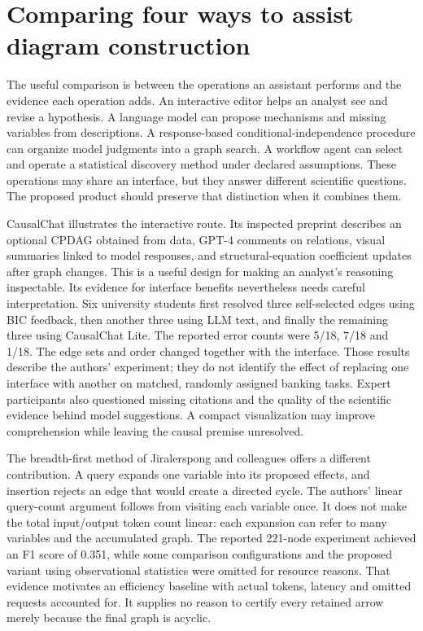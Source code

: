 \hypertarget{comparing-four-ways-to-assist-diagram-construction}{%
\section{Comparing four ways to assist diagram
construction}\label{comparing-four-ways-to-assist-diagram-construction}}

The useful comparison is between the operations an assistant performs
and the evidence each operation adds. An interactive editor helps an
analyst see and revise a hypothesis. A language model can propose
mechanisms and missing variables from descriptions. A response-based
conditional-independence procedure can organize model judgments into a
graph search. A workflow agent can select and operate a statistical
discovery method under declared assumptions. These operations may share
an interface, but they answer different scientific questions. The
proposed product should preserve that distinction when it combines them.

CausalChat illustrates the interactive route. Its inspected preprint
describes an optional CPDAG obtained from data, GPT-4 comments on
relations, visual summaries linked to model responses, and
structural-equation coefficient updates after graph changes. This is a
useful design for making an analyst's reasoning inspectable. Its
evidence for interface benefits nevertheless needs careful
interpretation. Six university students first resolved three
self-selected edges using BIC feedback, then another three using LLM
text, and finally the remaining three using CausalChat Lite. The
reported error counts were 5/18, 7/18 and 1/18. The edge sets and order
changed together with the interface. Those results describe the authors'
experiment; they do not identify the effect of replacing one interface
with another on matched, randomly assigned banking tasks. Expert
participants also questioned missing citations and the quality of the
scientific evidence behind model suggestions. A compact visualization
may improve comprehension while leaving the causal premise unresolved.
\citep{v12_la_2410_14146}

The breadth-first method of Jiralerspong and colleagues offers a
different contribution. A query expands one variable into its proposed
effects, and insertion rejects an edge that would create a directed
cycle. The authors' linear query-count argument follows from visiting
each variable once. It does not make the total input/output token count
linear: each expansion can refer to many variables and the accumulated
graph. The reported 221-node experiment achieved an F1 score of 0.351,
while some comparison configurations and the proposed variant using
observational statistics were omitted for resource reasons. That
evidence motivates an efficiency baseline with actual tokens, latency
and omitted requests accounted for. It supplies no reason to certify
every retained arrow merely because the final graph is acyclic.
\citep{v12_la_2402_01207}

